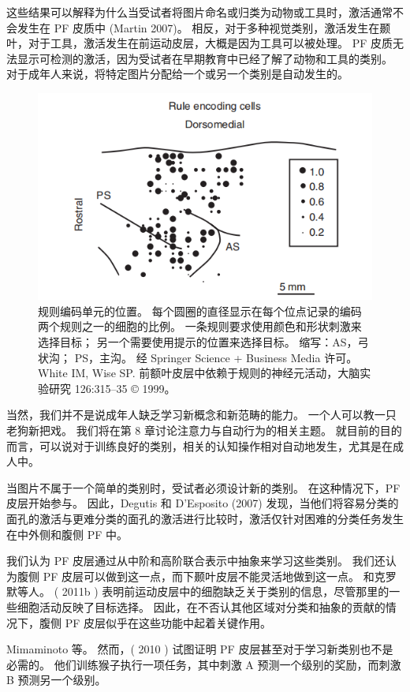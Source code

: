 \par
这些结果可以解释为什么当受试者将图片命名或归类为动物或工具时，激活通常不会发生在 PF 皮质中 (Martin 2007)。 
相反，对于多种视觉类别，激活发生在颞叶，对于工具，激活发生在前运动皮层，大概是因为工具可以被处理。 PF 皮质无法显示可检测的激活，因为受试者在早期教育中已经了解了动物和工具的类别。
对于成年人来说，将特定图片分配给一个或另一个类别是自动发生的。
\begin{figure}
	\centering
	\includegraphics[width=0.6\linewidth]{image_pfc/Fig_7_8}
	\caption{规则编码单元的位置。 
		每个圆圈的直径显示在每个位点记录的编码两个规则之一的细胞的比例。 
		一条规则要求使用颜色和形状刺激来选择目标； 另一个需要使用提示的位置来选择目标。 
		缩写：AS，弓状沟； PS，主沟。 
		经 Springer Science + Business Media 许可。 
		White IM, Wise SP.
		前额叶皮层中依赖于规则的神经元活动，大脑实验研究 126:315–35 © 1999。}
	\label{fig:fig}
\end{figure}
\par
当然，我们并不是说成年人缺乏学习新概念和新范畴的能力。 
一个人可以教一只老狗新把戏。 
我们将在第 8 章讨论注意力与自动行为的相关主题。
就目前的目的而言，可以说对于训练良好的类别，相关的认知操作相对自动地发生，尤其是在成人中。
\par
当图片不属于一个简单的类别时，受试者必须设计新的类别。 
在这种情况下，PF 皮层开始参与。 
因此，Degutis 和 D’Esposito (2007) 发现，当他们将容易分类的面孔的激活与更难分类的面孔的激活进行比较时，激活仅针对困难的分类任务发生在中外侧和腹侧 PF 中。
\par
我们认为 PF 皮层通过从中阶和高阶联合表示中抽象来学习这些类别。 
我们还认为腹侧 PF 皮层可以做到这一点，而下颞叶皮层不能灵活地做到这一点。 
和克罗默等人。 ( 2011b ) 表明前运动皮层中的细胞缺乏关于类别的信息，尽管那里的一些细胞活动反映了目标选择。 
因此，在不否认其他区域对分类和抽象的贡献的情况下，腹侧 PF 皮层似乎在这些功能中起着关键作用。
\par
Mimaminoto 等。 然而，( 2010 ) 试图证明 PF 皮层甚至对于学习新类别也不是必需的。 
他们训练猴子执行一项任务，其中刺激 A 预测一个级别的奖励，而刺激 B 预测另一个级别。 
